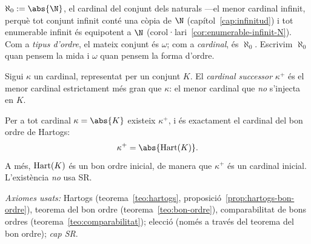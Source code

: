 \begin{definicio}[\(\aleph_0\)]\label{def:aleph0}
\(\aleph_0:=\abs{\N}\), el cardinal del conjunt dels naturals ---el menor
cardinal infinit, perquè tot conjunt infinit conté una còpia de \(\N\)
(capítol~\ref{cap:infinitud}) i tot enumerable infinit és equipotent a \(\N\)
(corol·lari~\ref{cor:enumerable-infinit-N}). Com a \emph{tipus d'ordre}, el
mateix conjunt és \(\omega\); com a \emph{cardinal}, és \(\aleph_0\). Escrivim
\(\aleph_0\) quan pensem la mida i \(\omega\) quan pensem la forma d'ordre.
\end{definicio}

\begin{definicio}\label{def:cardinal-successor}
Sigui \(\kappa\) un cardinal, representat per un conjunt \(K\). El \emph{cardinal
successor} \(\kappa^{+}\) és el menor cardinal estrictament més gran que
\(\kappa\): el menor cardinal que \emph{no} s'injecta en \(K\).
\end{definicio}

\begin{proposicio}\label{prop:cardinal-successor}
Per a tot cardinal \(\kappa=\abs{K}\) existeix \(\kappa^{+}\), i és
exactament el cardinal del bon ordre de Hartogs:
\[
\kappa^{+}=\abs{\Hart(K)}.
\]
A més, \(\operatorname{Hart}(K)\) és un bon ordre inicial, de manera que \(\kappa^{+}\) és un
cardinal inicial. L'existència \emph{no} usa SR.\par
\emph{Axiomes usats:} Hartogs (teorema~\ref{teo:hartogs},
proposició~\ref{prop:hartogs-bon-ordre}), teorema del bon ordre
(teorema~\ref{teo:bon-ordre}), comparabilitat de bons ordres
(teorema~\ref{teo:comparabilitat}); elecció (només a través del teorema del
bon ordre); \emph{cap SR}.
\end{proposicio}

